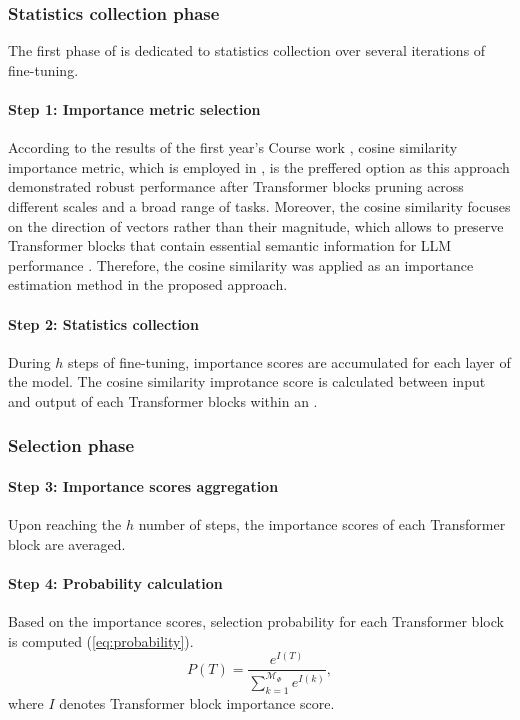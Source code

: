         \subsubsection{Statistics collection phase} The first phase of \ourmethodshort{} is dedicated to statistics collection over several iterations of fine-tuning.
            \paragraph{Step 1: Importance metric selection} According to the results of the first year's Course work \cite{Novikova2026}, cosine similarity importance metric, which is employed in \uidl{}, is the preffered option as this approach demonstrated robust performance after Transformer blocks pruning across different \llm{} scales and a broad range of tasks. Moreover, the cosine similarity focuses on the direction of vectors rather than their magnitude, which allows to preserve Transformer blocks that contain essential semantic information for LLM performance \cite{mi2025aceexploringactivationcosine}. Therefore, the cosine similarity was applied as an importance estimation method in the proposed approach. 
            \paragraph{Step 2: Statistics collection} During \(h\) steps of fine-tuning, importance scores are accumulated for each layer of the model. The cosine similarity improtance score is calculated between input and output of each Transformer blocks within an \llm{}. 
        \subsubsection{Selection phase} 
            \paragraph{Step 3: Importance scores aggregation} Upon reaching the \(h\) number of steps, the importance scores of each Transformer block are averaged.
            \paragraph{Step 4: Probability calculation} Based on the importance scores, selection probability for each Transformer block is computed (\ref{eq:probability}). 
            \begin{equation}\label{eq:probability}
                P(T) = \frac{e^{I(T)}}{\sum_{k=1}^{\mathcal{M}_\Phi}e^{I(k)}},
            \end{equation}
            where \(I\) denotes Transformer block importance score.
